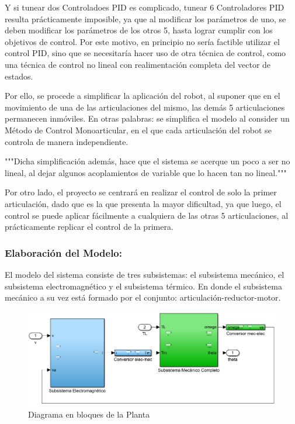 \documentclass{article}
\begin{document}
Y si tunear dos Controladoes PID es complicado, tunear 6 Controladores PID resulta prácticamente imposible, ya que al modificar los parámetros de uno, se deben modificar los parámetros de los otros 5, hasta lograr cumplir con los objetivos de control.
Por este motivo, en principio no sería factible utilizar el control PID, sino que se necesitaría hacer uso de otra técnica de control, como una técnica de control no lineal con realimentación completa del vector de estados.

Por ello, se procede a simplificar la aplicación del robot, al suponer que en el movimiento de una de las articulaciones del mismo, las demás 5 articulaciones permanecen inmóviles. En otras palabras: se simplifica el modelo al consider un Método de Control Monoarticular, en el que cada articulación del robot se controla de manera independiente.

"""Dicha simplificación además, hace que el sistema se acerque un poco a ser no lineal, al dejar algunos acoplamientos de variable que lo hacen tan no lineal."""

Por otro lado, el proyecto se centrará en realizar el control de solo la primer articulación, dado que es la que presenta la mayor dificultad, ya que luego, el control se puede aplicar fácilmente a cualquiera de las otras 5 articulaciones, al prácticamente replicar el control de la primera.

\subsubsection*{Elaboración del Modelo:}
\label{sec:Elaboración del Modelo:}

El modelo del sistema consiste de tres subsistemas: el subsistema mecánico, el subsistema electromagnético y el subsistema térmico. En donde el subsistema mecánico a su vez está formado por el conjunto: articulación-reductor-motor.

\begin{figure}[H]
    \centering
    \includegraphics[width=1.1\textwidth] {Diagrama en bloques de la Planta}
    \caption{Diagrama en bloques de la Planta}
    \label{fig:Diagrama en bloques de la Planta}
\end{figure}
\end{document}
